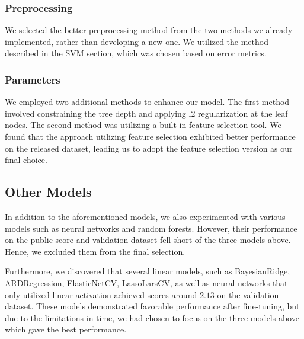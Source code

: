 \documentclass[10pt,letterpaper]{article}
\begin{document}
\subsubsection{Preprocessing}

We selected the better preprocessing method from the two methods we already implemented, rather than developing a new one. We utilized the method described in the SVM section, which was chosen based on error metrics.

\subsubsection{Parameters}

We employed two additional methods to enhance our model. The first method involved constraining the tree depth and applying l2 regularization at the leaf nodes. The second method was utilizing a built-in feature selection tool. We found that the approach utilizing feature selection exhibited better performance on the released dataset, leading us to adopt the feature selection version as our final choice.


\subsection{Other Models}

In addition to the aforementioned models, we also experimented with various models such as neural networks and random forests. However, their performance on the public score and validation dataset fell short of the three models above. Hence, we excluded them from the final selection.

Furthermore, we discovered that several linear models, such as BayesianRidge, ARDRegression, ElasticNetCV, LassoLarsCV, as well as neural networks that only utilized linear activation achieved scores around $2.13$ on the validation dataset. These models demonstrated favorable performance after fine-tuning, but due to the limitations in time, we had chosen to focus on the three models above which gave the best performance. 
\end{document}
